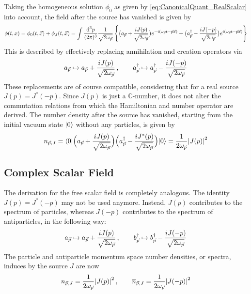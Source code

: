 Taking the homogeneous solution $\phi_0$ as given by \eqref{eq:CanonicalQuant_RealScalar} into account, the field after the source has vanished is given by
\begin{equation}
    \phi(t,x)=\phi_0(t,\vec{x})+\phi_J(t,\vec{x})               =\int\frac{\text{d} ^3p}{(2\pi)^3}\frac{1}{\sqrt{2\omega_{\vec{p}}}}\left\{\big(a_{\vec{p}}+\frac{{i} J(p)}{\sqrt{2\omega_{\vec{p}}}}\big)e^{-{i}(\omega_{\vec{p}}t-\vec{p}\vec{x})}+\big(a_{\vec{p}}^\dagger-\frac{{i} J(-p)}{\sqrt{2\omega_{\vec{p}}}}\big)e^{{i}(\omega_{\vec{p}}t-\vec{p}\vec{x})}\right\}
\end{equation}
This is described by effectively replacing annihilation and creation operators via
\begin{equation}
    a_{\vec{p}}\mapsto a_{\vec{p}}+\frac{{i} J(p)}{\sqrt{2\omega_{\vec{p}}}}\,,\qquad a_{\vec{p}}^\dagger\mapsto a_{\vec{p}}^\dagger-\frac{{i} J(-p)}{\sqrt{2\omega_{\vec{p}}}}
\end{equation}
These replacements are of course compatible, considering that for a real source $J(p)=J^*(-p)$. Since $J(p)$ is just a $\mathbb{C}$-number, it does not alter the commutation relations from which the Hamiltonian and number operator are derived. The number density after the source has vanished, starting from the initial vacuum state ${\lvert0\rangle}$ without any particles, is given by
\begin{equation}
    n_{\vec{p},J}={\langle0\rvert}\Big(a_{\vec{p}}+\frac{{i} J(p)}{\sqrt{2\omega_{\vec{p}}}}\Big)\Big(a_{\vec{p}}^\dagger-\frac{{i} J^*(p)}{\sqrt{2\omega_{\vec{p}}}}\Big){\lvert0\rangle}=\frac{1}{2\omega_{\vec{p}}}{\vert J(p)\vert}^2
\end{equation}

\subsection{Complex Scalar Field}

The derivation for the free scalar field is completely analogous. The identity $J(p)=J^*(-p)$ may not be used anymore. Instead, $J(p)$ contributes to the spectrum of particles, whereas $J(-p)$ contributes to the spectrum of antiparticles, in the following way:
\begin{equation}
    a_{\vec{p}}\mapsto a_{\vec{p}}+\frac{{i} J(p)}{\sqrt{2\omega_{\vec{p}}}}\,,\qquad b_{\vec{p}}^\dagger\mapsto b_{\vec{p}}^\dagger-\frac{{i} J(-p)}{\sqrt{2\omega_{\vec{p}}}}
\end{equation}
The particle and antiparticle momentum space number densities, or spectra, induces by the source $J$ are now
\begin{equation}
    n_{\vec{p},J}=\frac{1}{2\omega_{\vec{p}}}{\vert J(p)\vert}^2\,,\qquad \overline{n}_{\vec{p},J}=\frac{1}{2\omega_{\vec{p}}}{\vert J(-p)\vert}^2
\end{equation}

